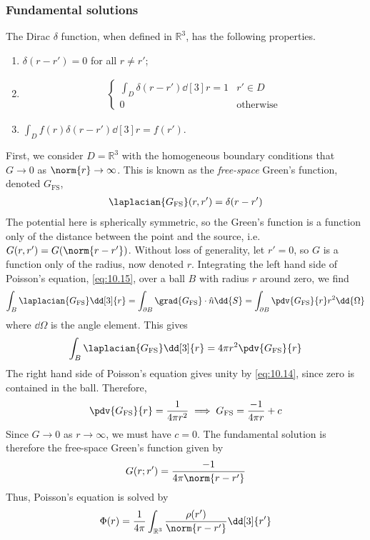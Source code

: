 \subsubsection{Fundamental solutions}
The Dirac $\delta$ function, when defined in $\mathbb R^3$, has the following properties.
\begin{enumerate}
	\item $\delta(r - r') = 0$ for all $r \neq r'$;
	\item \begin{align} \label{eq:10.14}
		\begin{cases}
			\int_D \delta(r - r') \dd[3]{r} = 1 & r' \in D \\
			0 & \text{otherwise}
		\end{cases} 
	\end{align} 
	\item $\int_D f(r) \delta(r - r') \dd[3]{r} = f(r')$.
\end{enumerate}
First, we consider $D = \mathbb R^3$ with the homogeneous boundary conditions that $G \to 0$ as $\norm{r} \to \infty$.
This is known as the \textit{free-space} Green's function, denoted $G_{\mathrm{FS}}$,
\begin{align} \label{eq:10.15}
	\laplacian{G_{\mathrm{FS}}}(r, r') = \delta(r - r')
\end{align} 
The potential here is spherically symmetric, so the Green's function is a function only of the distance between the point and the source, i.e. $G(r, r') = G(\norm{r - r'})$.
Without loss of generality, let $r' = 0$, so $G$ is a function only of the radius, now denoted $r$.
Integrating the left hand side of Poisson's equation, \cref{eq:10.15}, over a ball $B$ with radius $r$ around zero, we find
\begin{align*}
	\int_B \laplacian{G_{\mathrm{FS}}} \dd[3]{r} = \int_{\partial B} \grad{G_{\mathrm{FS}}} \cdot \hat n \dd{S} = \int_{\partial B} \pdv{G_{\mathrm{FS}}}{r} r^2 \dd{\Omega}
\end{align*}
where $\dd{\Omega}$ is the angle element.
This gives
\begin{align*}
	\int_B \laplacian{G_{\mathrm{FS}}} \dd[3]{r} = 4 \pi r^2 \pdv{G_{\mathrm{FS}}}{r}
\end{align*}
The right hand side of Poisson's equation gives unity by \cref{eq:10.14}, since zero is contained in the ball.
Therefore,
\begin{align*}
	\pdv{G_{\mathrm{FS}}}{r} = \frac{1}{4 \pi r^2} \implies G_{\mathrm{FS}} = \frac{-1}{4 \pi r} + c
\end{align*}
Since $G \to 0$ as $r \to \infty$, we must have $c = 0$.
The fundamental solution is therefore the free-space Green's function given by
\begin{align} \label{eq:10.16}
	G(r; r') = \frac{-1}{4 \pi \norm{r - r'}}
\end{align}
Thus, Poisson's equation is solved by
\begin{align*}
	\Phi(r) = \frac{1}{4 \pi} \int_{\mathbb R^3} \frac{\rho(r')}{\norm{r - r'}} \dd[3]{r'}
\end{align*}

